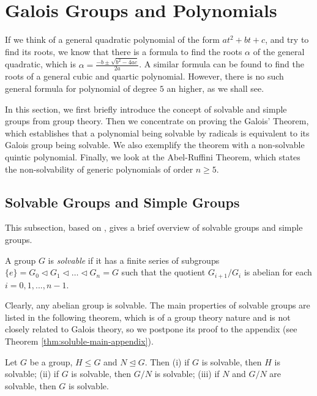 \section{Galois Groups and Polynomials} \label{sec:galois-groups-and-polynomials}
If we think of a general quadratic polynomial of the form $at^2+bt+c$, and try to find its roots, we know that there is a formula to find the roots $\alpha$ of the general quadratic, which is $\alpha = \frac{-b \pm \sqrt{b^2 - 4ac}}{2a}$. A similar formula can be found to find the roots of a general cubic and quartic polynomial. However, there is no such general formula for polynomial of degree $5$ an higher, as we shall see. 

In this section, we first briefly introduce the concept of solvable and simple groups from group theory. Then we concentrate on proving the Galois' Theorem, which establishes that a polynomial being solvable by radicals is equivalent to its Galois group being solvable. We also exemplify the theorem with a non-solvable quintic polynomial. Finally, we look at the Abel-Ruffini Theorem, which states the non-solvability of generic polynomials of order $n \ge 5$. 
\subsection{Solvable Groups and Simple Groups}
This subsection, based on \cite[Chapter~14]{Stewart}, gives a brief overview of solvable groups and simple groups. 
\begin{definition} \label{def:soluble}
    A group $G$ is \textit{solvable} if it has a finite series of subgroups 
    $ \{ e \} = G_0 \triangleleft G_1 \triangleleft \dots \triangleleft G_n = G$
    such that the quotient $G_{i+1} / G_{i}$ is abelian for each $i = 0, 1, ...,  n - 1$.
\end{definition}

Clearly, any abelian group is solvable. The main properties of solvable groups are listed in the following theorem, which is of a group theory nature and is not closely related to Galois theory, so we postpone its proof to the appendix (see Theorem \ref{thm:soluble-main-appendix}). 

\begin{theorem} \label{thm:soluble-main}
    Let $G$ be a group, $H \le G$ and $N \trianglelefteq G$. Then 
    (i) if $G$ is solvable, then $H$ is solvable;
    (ii) if $G$ is solvable, then $G / N$ is solvable; 
    (iii) if $N$ and $G / N$ are solvable, then $G$ is solvable. 
\end{theorem}


